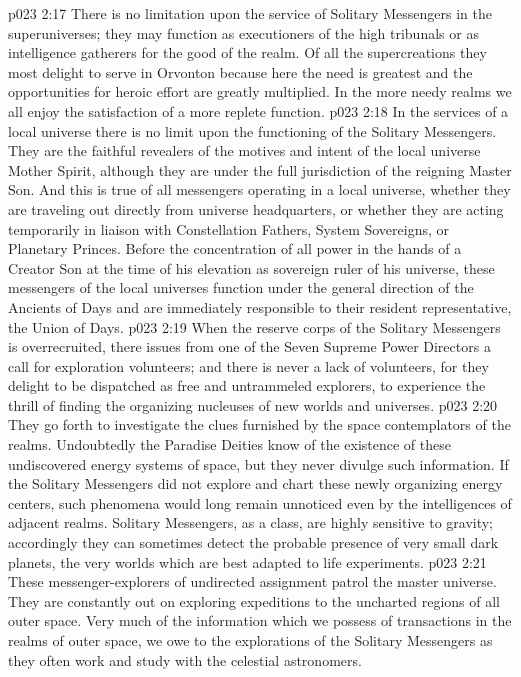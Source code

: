 \vs p023 2:17 There is no limitation upon the service of Solitary Messengers in the superuniverses; they may function as executioners of the high tribunals or as intelligence gatherers for the good of the realm. Of all the supercreations they most delight to serve in Orvonton because here the need is greatest and the opportunities for heroic effort are greatly multiplied. In the more needy realms we all enjoy the satisfaction of a more replete function.
\pc \vs p023 2:18 \bibnobreakspace {} In the services of a local universe there is no limit upon the functioning of the Solitary Messengers. They are the faithful revealers of the motives and intent of the local universe Mother Spirit, although they are under the full jurisdiction of the reigning Master Son. And this is true of all messengers operating in a local universe, whether they are traveling out directly from universe headquarters, or whether they are acting temporarily in liaison with Constellation Fathers, System Sovereigns, or Planetary Princes. Before the concentration of all power in the hands of a Creator Son at the time of his elevation as sovereign ruler of his universe, these messengers of the local universes function under the general direction of the Ancients of Days and are immediately responsible to their resident representative, the Union of Days.
\pc \vs p023 2:19 \bibnobreakspace {} When the reserve corps of the Solitary Messengers is overrecruited, there issues from one of the Seven Supreme Power Directors a call for exploration volunteers; and there is never a lack of volunteers, for they delight to be dispatched as free and untrammeled explorers, to experience the thrill of finding the organizing nucleuses of new worlds and universes.
\vs p023 2:20 They go forth to investigate the clues furnished by the space contemplators of the realms. Undoubtedly the Paradise Deities know of the existence of these undiscovered energy systems of space, but they never divulge such information. If the Solitary Messengers did not explore and chart these newly organizing energy centers, such phenomena would long remain unnoticed even by the intelligences of adjacent realms. Solitary Messengers, as a class, are highly sensitive to gravity; accordingly they can sometimes detect the probable presence of very small dark planets, the very worlds which are best adapted to life experiments.
\vs p023 2:21 These messenger\hyp{}explorers of undirected assignment patrol the master universe. They are constantly out on exploring expeditions to the uncharted regions of all outer space. Very much of the information which we possess of transactions in the realms of outer space, we owe to the explorations of the Solitary Messengers as they often work and study with the celestial astronomers.
